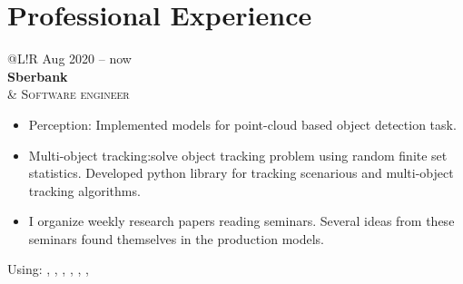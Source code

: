 \section*{Professional Experience}
\begin{tabular}{@{}L!{\VRule}R}
    Aug 2020 -- now                                                                                                       \\ {\bf Sberbank} \\  &
    {\textsc{Software engineer}}
    \begin{itemize}
        \item Perception: Implemented models for point-cloud based object detection task.
        \item Multi-object tracking:solve object tracking problem using random finite set statistics. Developed python library for tracking scenarious and multi-object tracking algorithms.
        \item I organize weekly research papers reading seminars. Several ideas from these seminars found themselves in the production models.
    \end{itemize}
    Using: , , , , , ,                                                                                        \\
\end{tabular}     
